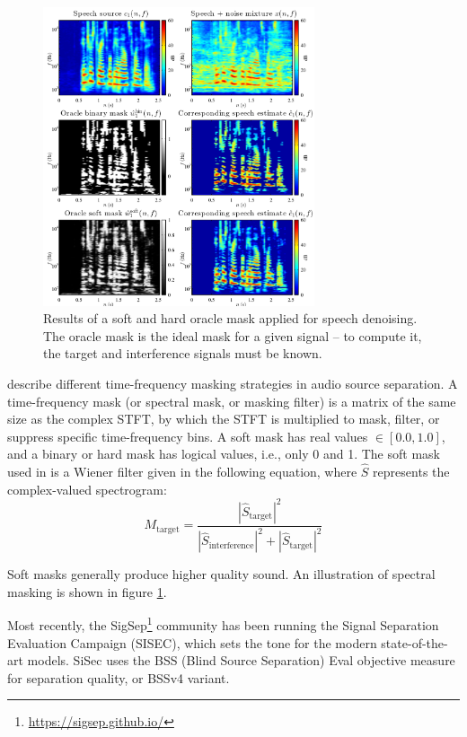 \documentclass[letter,12pt,notitlepage]{article}
\begin{document}
\begin{figure}
	\vspace{-1.0em}
	\includegraphics[width=8cm]{./maskdemo.png}
	\caption{Results of a soft and hard oracle mask applied for speech denoising. The oracle mask is the ideal mask for a given signal -- to compute it, the target and interference signals must be known.}
	\label{fig:masks}
	\vspace{-1.5em}
\end{figure}

\citet{masking} describe different time-frequency masking strategies in audio source separation. A time-frequency mask (or spectral mask, or masking filter) is a matrix of the same size as the complex STFT, by which the STFT is multiplied to mask, filter, or suppress specific time-frequency bins. A soft mask has real values $\in [0.0, 1.0]$, and a binary or hard mask has logical values, i.e., only 0 and 1. The soft mask used in \cite{fitzgerald1, fitzgerald2} is a Wiener filter given in the following equation, where $\hat{S}$ represents the complex-valued spectrogram:
\[ M_{\text{target}} = \frac{|\hat{S}_{\text{target}}|^{2}}{|\hat{S}_{\text{interference}}|^{2} + |\hat{S}_{\text{target}}|^{2}} \]

Soft masks generally produce higher quality sound. An illustration of spectral masking is shown in figure \ref{fig:masks}.

Most recently, the SigSep\footnote{\url{https://sigsep.github.io/}} community has been running the Signal Separation Evaluation Campaign (SISEC), which sets the tone for the modern state-of-the-art models. SiSec uses the BSS (Blind Source Separation) Eval \cite{bss} objective measure for separation quality, or BSSv4 variant.
\end{document}
